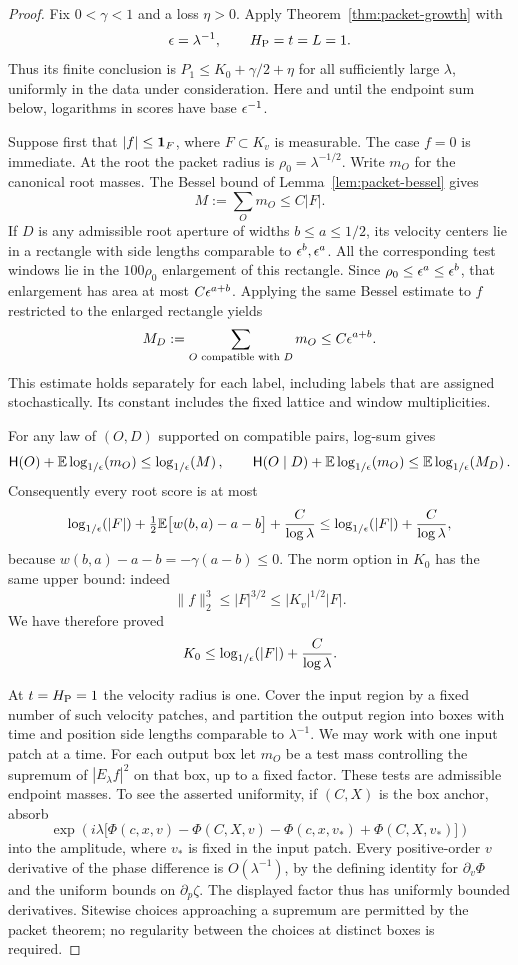 \begin{proof}
Fix $0<\gamma<1$ and a loss $\eta>0$.  Apply
Theorem~\ref{thm:packet-growth} with
\[
 \epsilon=\lambda^{-1},\qquad H_{\mathrm P}=t=L=1.
\]
Thus its finite conclusion is $P_1\le K_0+\gamma/2+\eta$ for all
sufficiently large $\lambda$, uniformly in the data under consideration.
Here and until the endpoint sum below, logarithms in scores have base
$\epsilon^{-1}$.

Suppose first that $|f|\le\mathbf 1_F$, where $F\subset K_v$ is measurable.
The case $f=0$ is immediate.  At the root the packet radius is
$\rho_0=\lambda^{-1/2}$.  Write $m_O$ for the canonical root masses.
The Bessel bound of Lemma~\ref{lem:packet-bessel} gives
\[
 M:=\sum_Om_O\le C|F|.
\]
If $D$ is any admissible root aperture of widths $b\le a\le1/2$, its
velocity centers lie in a rectangle with side lengths comparable to
$\epsilon^b,\epsilon^a$.  All the corresponding test windows lie in the
$100\rho_0$ enlargement of this rectangle.  Since
$\rho_0\le\epsilon^a\le\epsilon^b$, that enlargement has area at most
$C\epsilon^{a+b}$.  Applying the same Bessel estimate to $f$ restricted to
the enlarged rectangle yields
\begin{equation}\label{eq:restricted-root-cap}
 M_D:=\sum_{O\text{ compatible with }D}m_O
 \le C\epsilon^{a+b}.
\end{equation}
This estimate holds separately for each label, including labels that
are assigned stochastically.  Its constant includes the fixed lattice
and window multiplicities.

For any law of $(O,D)$ supported on compatible pairs, log-sum gives
\[
 \mathsf H(O)+\mathbb E\log_{1/\epsilon}\!\left(m_O\right)\le\log_{1/\epsilon}\!\left(M\right),
 \qquad
 \mathsf H(O\mid D)+\mathbb E\log_{1/\epsilon}\!\left(m_O\right)\le\mathbb E\log_{1/\epsilon}\!\left(M_D\right).
\]
Consequently every root score is at most
\[
 \log_{1/\epsilon}\!\left(|F|\right)
 +\tfrac12\mathbb E\bigl[w(b,a)-a-b\bigr]
 +\frac{C}{\log\lambda}
 \le \log_{1/\epsilon}\!\left(|F|\right)+\frac{C}{\log\lambda},
\]
because $w(b,a)-a-b=-\gamma(a-b)\le0$.  The norm option in $K_0$
has the same upper bound: indeed
\[
 \|f\|_2^3\le |F|^{3/2}\le |K_v|^{1/2}|F|.
\]
We have therefore proved
\begin{equation}\label{eq:restricted-root-score}
 K_0\le\log_{1/\epsilon}\!\left(|F|\right)+\frac{C}{\log\lambda}.
\end{equation}

At $t=H_{\mathrm P}=1$ the velocity radius is one.  Cover the input region
by a fixed number of such velocity patches, and partition the output
region into boxes with time and position side lengths comparable to
$\lambda^{-1}$.  We may work with one input patch at a time.  For each
output box let $m_O$ be a test mass controlling the supremum of
$|E_\lambda f|^2$ on that box, up to a fixed factor.  These tests are
admissible endpoint masses.  To see the asserted uniformity, if
$(C,X)$ is the box anchor, absorb
\[
 \exp\!\left(i\lambda\bigl[
 \Phi(c,x,v)-\Phi(C,X,v)
 -\Phi(c,x,v_*)+\Phi(C,X,v_*)\bigr]\right)
\]
into the amplitude, where $v_*$ is fixed in the input patch.  Every
positive-order $v$ derivative of the phase difference is
$O(\lambda^{-1})$, by the defining identity for $\partial_v\Phi$ and
the uniform bounds on $\partial_p\zeta$.  The displayed factor thus
has uniformly bounded derivatives.  Sitewise choices approaching a
supremum are permitted by the packet theorem; no regularity between
the choices at distinct boxes is required.


\end{proof}
